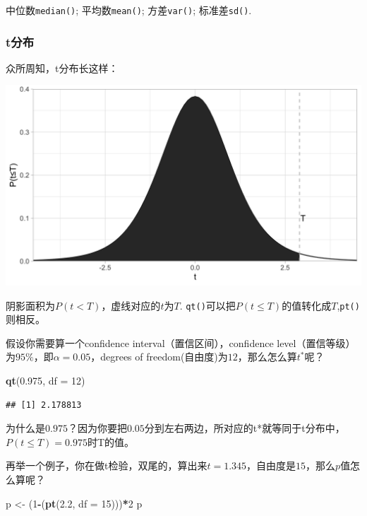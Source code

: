 \documentclass[]{book}
\newenvironment{Shaded}{\begin{snugshade}}{\end{snugshade}}
\newcommand{\DataTypeTok}[1]{\textcolor[rgb]{0.13,0.29,0.53}{#1}}
\newcommand{\DecValTok}[1]{\textcolor[rgb]{0.00,0.00,0.81}{#1}}
\newcommand{\FloatTok}[1]{\textcolor[rgb]{0.00,0.00,0.81}{#1}}
\newcommand{\KeywordTok}[1]{\textcolor[rgb]{0.13,0.29,0.53}{\textbf{#1}}}
\newcommand{\NormalTok}[1]{#1}
\newcommand{\OperatorTok}[1]{\textcolor[rgb]{0.81,0.36,0.00}{\textbf{#1}}}
\newcommand{\StringTok}[1]{\textcolor[rgb]{0.31,0.60,0.02}{#1}}
\begin{document}
中位数\texttt{median()}; 平均数\texttt{mean()}; 方差\texttt{var()}; 标准差\texttt{sd()}.

\hypertarget{t}{%
\subsubsection{t分布}\label{t}}

众所周知，t分布长这样：

\includegraphics[width=26.67in]{img/graphics/t-distribution}

阴影面积为\(P(t<T)\)，虚线对应的\(t\)为\(T\).
\texttt{qt()}可以把\(P(t≤T)\)的值转化成\(T\),\texttt{pt()}则相反。

假设你需要算一个confidence interval（置信区间），confidence level（置信等级）为\(95\%\)，即\(\alpha=0.05\)，degrees of freedom(自由度)为\(12\)，那么怎么算\(t^*\)呢？

\begin{Shaded}
\begin{Highlighting}[]
\KeywordTok{qt}\NormalTok{(}\FloatTok{0.975}\NormalTok{, }\DataTypeTok{df =} \DecValTok{12}\NormalTok{)}
\end{Highlighting}
\end{Shaded}

\begin{verbatim}
## [1] 2.178813
\end{verbatim}

为什么是\(0.975\)？因为你要把\(0.05\)分到左右两边，所对应的t*就等同于t分布中，\(P(t ≤ T) = 0.975\)时T的值。

再举一个例子，你在做t检验，双尾的，算出来\(t=1.345\)，自由度是\(15\)，那么\(p\)值怎么算呢？

\begin{Shaded}
\begin{Highlighting}[]
\NormalTok{p <-}\StringTok{ }\NormalTok{(}\DecValTok{1}\OperatorTok{-}\NormalTok{(}\KeywordTok{pt}\NormalTok{(}\FloatTok{2.2}\NormalTok{, }\DataTypeTok{df =} \DecValTok{15}\NormalTok{)))}\OperatorTok{*}\DecValTok{2}
\NormalTok{p}
\end{Highlighting}
\end{Shaded}
\end{document}
